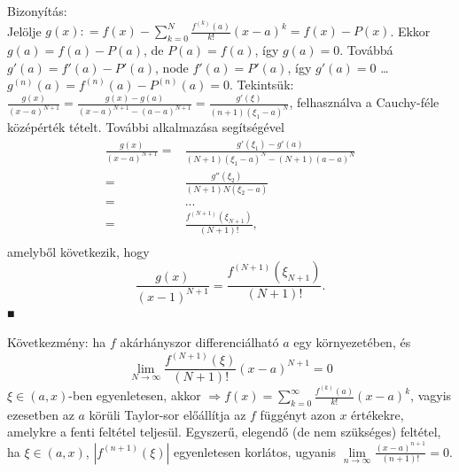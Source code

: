\documentclass[12pt,a4paper]{scrartcl}
\newenvironment{bizonyitas}{}{}
\begin{document}
\begin{bizonyitas}

Bizonyítás:\\
Jelölje
\(g\left( x \right): = f\left( x \right) - {\sum\limits_{k = 0}^{N}{\frac{f^{(k)}\left( a \right)}{k!}\left( {x - a} \right)^{k}}} = f\left( x \right) - P\left( x \right)\).
Ekkor \(g\left( a \right) = f\left( a \right) - P\left( a \right)\), de
\(P\left( a \right) = f\left( a \right)\), így
\(g\left( a \right) = 0\). Továbbá
\(g'\left( a \right) = f'\left( a \right) - P'\left( a \right)\), node
\(f'\left( a \right) = P'\left( a \right)\), így
\(g'\left( a \right) = 0\) \ldots{}
\(g^{(n)}\left( a \right) = f^{(n)}\left( a \right) - P^{(n)}\left( a \right) = 0\).
Tekintsük:
\(\frac{g\left( x \right)}{\left( {x - a} \right)^{N + 1}} = \frac{g\left( x \right) - g\left( a \right)}{\left( {x - a} \right)^{N + 1} - \left( {a - a} \right)^{N + 1}} = \frac{g'\left( \xi \right)}{\left( {n + 1} \right)\left( {\xi_{1} - a} \right)^{N}}\),
felhasználva a Cauchy-féle középérték tételt. További alkalmazása
segítségével \[\begin{aligned}
  \frac{{g\left( x \right)}}{{{{\left( {x - a} \right)}^{N + 1}}}} =  & \frac{{g'\left( {{\xi _1}} \right) - g'\left( a \right)}}{{\left( {N + 1} \right){{\left( {{\xi _1} - a} \right)}^N} - \left( {N + 1} \right){{\left( {a - a} \right)}^N}}} \\ 
   =  & \frac{{g''\left( {{\xi _2}} \right)}}{{\left( {N + 1} \right)N\left( {{\xi _2} - a} \right)}} \\ 
   =  & ... \\ 
   =  & \frac{{{f^{\left( {N + 1} \right)}}\left( {{\xi _{N + 1}}} \right)}}{{\left( {N + 1} \right)!}}, \\ 
\end{aligned} \] amelyből következik, hogy
\[\frac{{g\left( x \right)}}{{{{\left( {x - 1} \right)}^{N + 1}}}} = \frac{{{f^{\left( {N + 1} \right)}}\left( {{\xi _{N + 1}}} \right)}}{{\left( {N + 1} \right)!}}.\]
■

\end{bizonyitas}

Következmény: ha \(f\) akárhányszor differenciálható \(a\) egy
környezetében, és
\[\lim\limits_{N\rightarrow\infty}\frac{f^{({N + 1})}\left( \xi \right)}{\left( {N + 1} \right)!}\left( {x - a} \right)^{N + 1} = 0\]
\(\xi \in \left( {a,x} \right)\)-ben egyenletesen, akkor
\(\left. \Rightarrow f\left( x \right) = {\sum\limits_{k = 0}^{\infty}{\frac{f^{(k)}\left( a \right)}{k!}\left( {x - a} \right)^{k}}} \right.\),
vagyis ezesetben az \(a\) körüli Taylor-sor előállítja az \(f\) függényt
azon \(x\) értékekre, amelykre a fenti feltétel teljesül. Egyszerű,
elegendő (de nem szükséges) feltétel, ha
\(\xi \in \left( {a,x} \right)\),
\(\left| {f^{({n + 1})}\left( \xi \right)} \right|\) egyenletesen
korlátos, ugyanis
\(\underset{n\rightarrow\infty}{\lim}\frac{\left( {x - a} \right)^{n + 1}}{\left( {n + 1} \right)!} = 0\).
\end{document}
